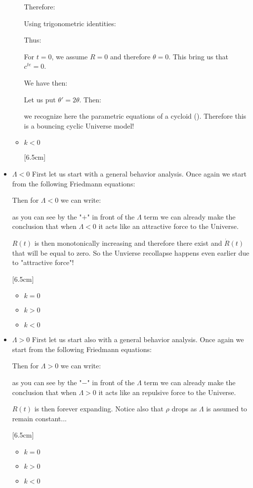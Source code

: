 \begin{itemize}
\begin{itemize}
				Therefore:
				
				Using trigonometric identities:
				
				Thus:
				
				For $t=0$, we assume $R=0$ and therefore $\theta=0$. This bring us that $c^{te}=0$.
				
				We have then:
				
				Let us put $\theta'=2\theta$. Then:
				
				we recognize here the parametric equations of a cycloid (). Therefore this is a bouncing cyclic Universe model!
							
				\item $k<0$
				
				[6.5cm]
			\end{itemize}
	
		\item $\Lambda<0$
			First let us start with a general behavior analysis. Once again we start from the following Friedmann equations:
			
			Then for $\Lambda <0$ we can write:
			
			as you can see by the "$+$" in front of the $\Lambda$ term we can already make the conclusion that when $\Lambda<0$ it acts like an attractive force to the Universe.
			
			$R(t)$ is then monotonically increasing and therefore there exist and $\dot{R}(t)$ that will be equal to zero. So the Unvierse recollapse happens even earlier due to "attractive force"!
		
			[6.5cm]
			\begin{itemize}
				\item $k=0$
				\item $k>0$
				\item $k<0$
			\end{itemize}
	
		\item $\Lambda>0$
			First let us start also with a general behavior analysis. Once again we start from the following Friedmann equations:
			
			Then for $\Lambda >0$ we can write:
			
			as you can see by the "$-$" in front of the $\Lambda$ term we can already make the conclusion that when $\Lambda>0$ it acts like an repulsive force to the Universe.
			
			$R(t)$ is then forever expanding. Notice also that $\rho$ drops as $\Lambda$ is assumed to remain constant...
			
			[6.5cm]
			\begin{itemize}
				\item $k=0$
				\item $k>0$
				\item $k<0$
			\end{itemize}
	\end{itemize}
	
